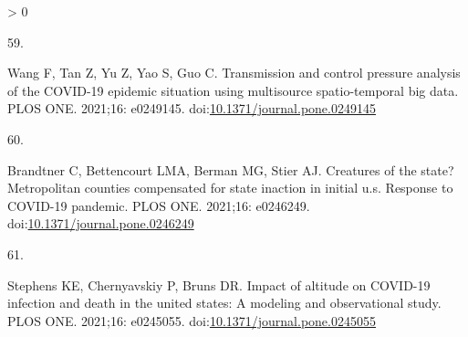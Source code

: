 \documentclass[10pt,letterpaper]{article}
\newlength{\csllabelwidth}
\newlength{\cslhangindent}
\newenvironment{CSLReferences}[3] %
 {%
  \setlength{\parindent}{0pt}
  \ifodd #1 \everypar{\setlength{\hangindent}{\cslhangindent}}\ignorespaces\fi
  \ifnum #2 > 0
  \setlength{\parskip}{#2\baselineskip}
  \fi
 }%
 {}
\newcommand{\CSLLeftMargin}[1]{\parbox[t]{\csllabelwidth}{#1}}
\newcommand{\CSLRightInline}[1]{\parbox[t]{\linewidth - \csllabelwidth}{#1}}
\begin{document}
\begin{CSLReferences}{0}{0}
\leavevmode\hypertarget{ref-Wang2021transmission}{}%
\CSLLeftMargin{59. }
\CSLRightInline{Wang F, Tan Z, Yu Z, Yao S, Guo C. Transmission and
control pressure analysis of the COVID-19 epidemic situation using
multisource spatio-temporal big data. PLOS ONE. 2021;16: e0249145.
doi:\href{https://doi.org/10.1371/journal.pone.0249145}{10.1371/journal.pone.0249145}}

\leavevmode\hypertarget{ref-Brandtner2021creatures}{}%
\CSLLeftMargin{60. }
\CSLRightInline{Brandtner C, Bettencourt LMA, Berman MG, Stier AJ.
Creatures of the state? Metropolitan counties compensated for state
inaction in initial u.s. Response to COVID-19 pandemic. PLOS ONE.
2021;16: e0246249.
doi:\href{https://doi.org/10.1371/journal.pone.0246249}{10.1371/journal.pone.0246249}}

\leavevmode\hypertarget{ref-Stephens2021impact}{}%
\CSLLeftMargin{61. }
\CSLRightInline{Stephens KE, Chernyavskiy P, Bruns DR. Impact of
altitude on COVID-19 infection and death in the united states: A
modeling and observational study. PLOS ONE. 2021;16: e0245055.
doi:\href{https://doi.org/10.1371/journal.pone.0245055}{10.1371/journal.pone.0245055}}

\end{CSLReferences}

\nolinenumbers
\end{document}
